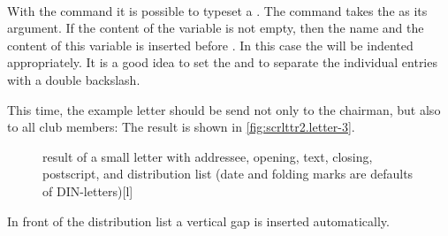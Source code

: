 \begin{Declaration}
  \\
\end{Declaration}
%
%
With the command %
 it is
possible to typeset a .  The command takes the
 as its argument. If the content of the variable
 is not empty, then
the name and the content of this variable is inserted before
.  In this case the  will be
indented appropriately.  It is a good idea to set the
  and to
separate the individual entries with a double backslash.
\begin{Example}
  This time, the example letter should be send not only to the chairman, but
  also to all club members:
  The result is shown in \autoref{fig:scrlttr2.letter-3}.
  \begin{figure}
    \setcapindent{0pt}%
    \begin{captionbeside}{%
        result of a small letter with addressee, opening, text, closing,
        postscript, and distribution list
        (date and folding marks are defaults of DIN-letters)}[l]
    \end{captionbeside}
    \label{fig:scrlttr2.letter-3}
  \end{figure}
\end{Example}
In front of the distribution list a vertical gap is inserted automatically.%
%
%
%



